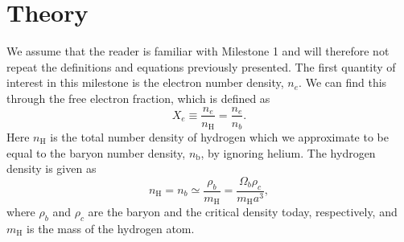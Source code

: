 \documentclass[a4paper, 10pt, reqno]{amsart}
\begin{document}
\section{Theory}

We assume that the reader is familiar with Milestone 1 and will therefore not
repeat the definitions and equations previously presented. The first quantity
of interest in this milestone is the electron number density, $n_e$. We can
find this through the free electron fraction, which is defined as
\begin{equation}\label{eq: X_e}
    X_{e} \equiv \frac{n_{e}}{n_{\mathrm{H}}}=\frac{n_{e}}{n_{b}}.
\end{equation}
Here $n_{\mathrm{H}}$ is the total number density of hydrogen which we
approximate to be equal to the baryon number density, $n_{\mathrm{b}}$, by
ignoring helium. The hydrogen density is given as 
\begin{equation}\label{eq: n_e}
    n_{\mathrm{H}}=n_{b} \simeq
    \frac{\rho_{b}}{m_{\mathrm{H}}}=\frac{\Omega_{b} \rho_{c}}{m_{\mathrm{H}}
    a^{3}},
\end{equation}
where $\rho_b$ and $\rho_c$ are the baryon and the critical density today,
respectively, and $m_\mathrm{H}$ is the mass of the hydrogen atom.
\end{document}
